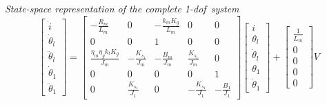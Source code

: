\noindent \textit{State-space representation of the complete \acrshort{1-dof}\ system}
\begin{equation}
	\begin{bmatrix}
		\dot{i} \\
		\dot{\theta}_l \\
		\ddot{\theta}_l \\
		\dot{\theta}_1 \\
		\ddot{\theta}_1
	\end{bmatrix}
	=
	\begin{bmatrix}
		-\frac{R_m}{L_m} & 0 & -\frac{k_m K_g}{L_m} & 0 & 0 \\
		0 & 0 &1 & 0 & 0 \\
		\frac{\eta_m \eta_g k_t K_g}{J_m} & -\frac{K_{s_1}}{J_m} & -\frac{B_m}{J_m} & \frac{K_{s_1}}{J_m} & 0 \\
		0 & 0 & 0 & 0 & 1 \\
		0 & \frac{K_{s_1}}{J_1} & 0 & -\frac{K_{s_1}}{J_1} & -\frac{B_1}{J_1}
	\end{bmatrix}
	\begin{bmatrix}
		i \\
		\theta_l \\
		\dot{\theta}_l \\
		\theta_1 \\
		\dot{\theta}_1
	\end{bmatrix}
	+
	\begin{bmatrix}
		\frac{1}{L_m} \\
		0 \\
		0 \\
		0 \\
		0
	\end{bmatrix}
	V
\end{equation}

